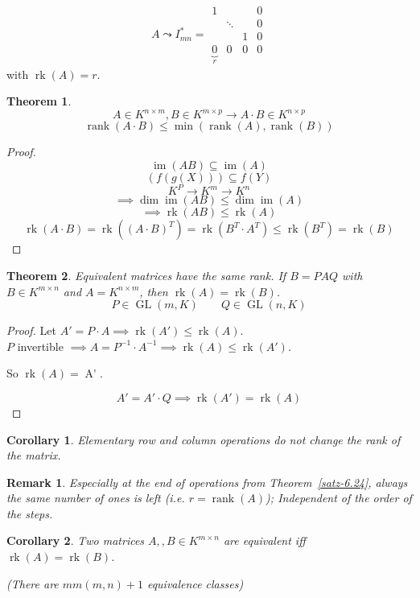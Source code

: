 \documentclass[a4paper,landscape,twocolumn]{article}
\newtheorem{theorem}{Theorem}[section]
\newtheorem{rem}{Remark}[section]
\newtheorem{cor}{Corollary}[section]
\DeclareMathOperator\image{im} %
\begin{document}
\[
  A \leadsto I_{mn}^* =
  \begin{matrix}
    1 &        &   & 0 \\
      & \ddots &   & 0 \\
      &        & 1 & 0 \\
    \underbrace{0}_r & 0      & 0 & 0
  \end{matrix}
\]
with $\operatorname{rk}(A) = r$.

\begin{theorem}
  \[ A \in K^{n\times m}, B \in K^{m \times p} \to A \cdot B \in K^{n\times p} \]
  \[ \operatorname{rank}(A \cdot B) \leq \min(\operatorname{rank}(A), \operatorname{rank}(B)) \]
\end{theorem}
\begin{proof}
  \[ \operatorname{im}(AB) \subseteq \operatorname{im}(A) \]
  \[ (f(g(X))) \subseteq f(Y) \]
  \[ K^P \to K^m \to K^n \]
  \[ \implies \dim{\image(AB)} \leq \dim{\image(A)} \]
  \[ \implies \operatorname{rk}(AB) \leq \operatorname{rk}(A) \]
  \[ \operatorname{rk}(A\cdot B) = \operatorname{rk}\left((A\cdot B)^T\right) = \operatorname{rk}(B^T \cdot A^T) \leq \operatorname{rk}(B^T) = \operatorname{rk}(B) \]
\end{proof}

\begin{theorem}
  \label{satz-6.30}
  Equivalent matrices have the same rank.
  If $B = P A Q$ with $B \in K^{m\times n}$ and $A = K^{n\times m}$,
  then $\operatorname{rk}(A) = \operatorname{rk}(B)$.
  \[ P \in \operatorname{GL}(m, K) \qquad Q \in \operatorname{GL}(n, K) \]
\end{theorem}
\begin{proof}
  Let $A' = P \cdot A \implies \operatorname{rk}(A') \leq \operatorname{rk}(A)$. \\
  $P$ invertible $\implies A = P^{-1} \cdot A^{-1} \implies \operatorname{rk}(A) \leq \operatorname{rk}(A')$.

  So $\operatorname{rk}(A) = \operatorname{A'}$.

  \[ A' = A' \cdot Q \implies \operatorname{rk}(A') = \operatorname{rk}(A) \]
\end{proof}

\begin{cor}
  \label{korollar-6.31}
  Elementary row and column operations do not change the rank of the matrix.
\end{cor}
\begin{rem}
  \label{bemerkung-3.32}
  Especially at the end of operations from Theorem~\ref{satz-6.24},
  always the same number of ones is left (i.e. $r = \operatorname{rank}(A)$);
  Independent of the order of the steps.
\end{rem}
\begin{cor}
  \label{korollar-6.33}
  Two matrices $A,, B \in K^{m\times n}$ are equivalent iff $\operatorname{rk}(A) = \operatorname{rk}(B)$.

  (There are $mm(m,n) + 1$ equivalence classes)
\end{cor}
\end{document}
